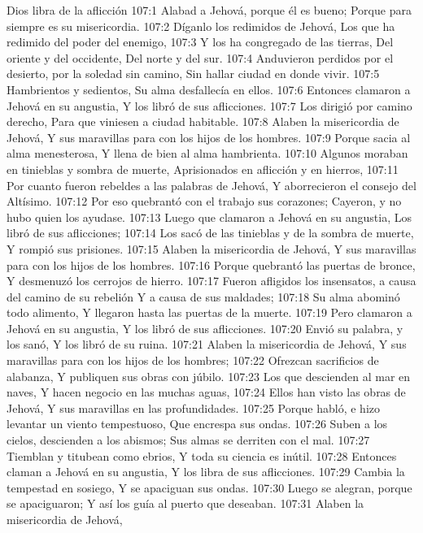 Dios libra de la aflicción 107:1 Alabad a Jehová, porque él es bueno; 
Porque para siempre es su misericordia. 
107:2 Díganlo los redimidos de Jehová, 
Los que ha redimido del poder del enemigo, 
107:3 Y los ha congregado de las tierras, 
Del oriente y del occidente, 
Del norte y del sur. 
107:4 Anduvieron perdidos por el desierto, por la soledad sin camino, 
Sin hallar ciudad en donde vivir. 
107:5 Hambrientos y sedientos, 
Su alma desfallecía en ellos. 
107:6 Entonces clamaron a Jehová en su angustia, 
Y los libró de sus aflicciones. 
107:7 Los dirigió por camino derecho, 
Para que viniesen a ciudad habitable. 
107:8 Alaben la misericordia de Jehová, 
Y sus maravillas para con los hijos de los hombres. 
107:9 Porque sacia al alma menesterosa, 
Y llena de bien al alma hambrienta. 
107:10 Algunos moraban en tinieblas y sombra de muerte, 
Aprisionados en aflicción y en hierros, 
107:11 Por cuanto fueron rebeldes a las palabras de Jehová, 
Y aborrecieron el consejo del Altísimo. 
107:12 Por eso quebrantó con el trabajo sus corazones; 
Cayeron, y no hubo quien los ayudase. 
107:13 Luego que clamaron a Jehová en su angustia, 
Los libró de sus aflicciones; 
107:14 Los sacó de las tinieblas y de la sombra de muerte, 
Y rompió sus prisiones. 
107:15 Alaben la misericordia de Jehová, 
Y sus maravillas para con los hijos de los hombres. 
107:16 Porque quebrantó las puertas de bronce, 
Y desmenuzó los cerrojos de hierro. 
107:17 Fueron afligidos los insensatos, a causa del camino de su rebelión 
Y a causa de sus maldades; 
107:18 Su alma abominó todo alimento, 
Y llegaron hasta las puertas de la muerte. 
107:19 Pero clamaron a Jehová en su angustia, 
Y los libró de sus aflicciones. 
107:20 Envió su palabra, y los sanó, 
Y los libró de su ruina. 
107:21 Alaben la misericordia de Jehová, 
Y sus maravillas para con los hijos de los hombres; 
107:22 Ofrezcan sacrificios de alabanza, 
Y publiquen sus obras con júbilo. 
107:23 Los que descienden al mar en naves, 
Y hacen negocio en las muchas aguas, 
107:24 Ellos han visto las obras de Jehová, 
Y sus maravillas en las profundidades. 
107:25 Porque habló, e hizo levantar un viento tempestuoso, 
Que encrespa sus ondas. 
107:26 Suben a los cielos, descienden a los abismos; 
Sus almas se derriten con el mal. 
107:27 Tiemblan y titubean como ebrios, 
Y toda su ciencia es inútil. 
107:28 Entonces claman a Jehová en su angustia, 
Y los libra de sus aflicciones. 
107:29 Cambia la tempestad en sosiego, 
Y se apaciguan sus ondas. 
107:30 Luego se alegran, porque se apaciguaron; 
Y así los guía al puerto que deseaban. 
107:31 Alaben la misericordia de Jehová, 
